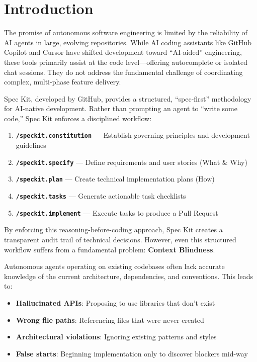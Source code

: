 \documentclass[sigconf,anonymous,review]{acmart}
\begin{document}
\maketitle

\section{Introduction}

The promise of autonomous software engineering is limited by the reliability of AI agents in large, evolving repositories. While AI coding assistants like GitHub Copilot and Cursor have shifted development toward ``AI-aided'' engineering, these tools primarily assist at the code level---offering autocomplete or isolated chat sessions. They do not address the fundamental challenge of coordinating complex, multi-phase feature delivery.

Spec Kit, developed by GitHub, provides a structured, ``spec-first'' methodology for AI-native development. Rather than prompting an agent to ``write some code,'' Spec Kit enforces a disciplined workflow:

\begin{enumerate}
  \item \textbf{\texttt{/speckit.constitution}} --- Establish governing principles and development guidelines
  \item \textbf{\texttt{/speckit.specify}} --- Define requirements and user stories (What \& Why)
  \item \textbf{\texttt{/speckit.plan}} --- Create technical implementation plans (How)
  \item \textbf{\texttt{/speckit.tasks}} --- Generate actionable task checklists
  \item \textbf{\texttt{/speckit.implement}} --- Execute tasks to produce a Pull Request
\end{enumerate}

By enforcing this reasoning-before-coding approach, Spec Kit creates a transparent audit trail of technical decisions. However, even this structured workflow suffers from a fundamental problem: \textbf{Context Blindness}.

Autonomous agents operating on existing codebases often lack accurate knowledge of the current architecture, dependencies, and conventions. This leads to:

\begin{itemize}
  \item \textbf{Hallucinated APIs}: Proposing to use libraries that don't exist
  \item \textbf{Wrong file paths}: Referencing files that were never created
  \item \textbf{Architectural violations}: Ignoring existing patterns and styles
  \item \textbf{False starts}: Beginning implementation only to discover blockers mid-way
\end{itemize}
\end{document}
